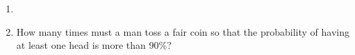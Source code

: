 \begin{enumerate}[label=\thechapter.\arabic*,ref=\thechapter.\theenumi]
\item 
\item How many times must a man toss a fair coin so that the probability of having
at least one head is more than 90\%?
\end{enumerate}
